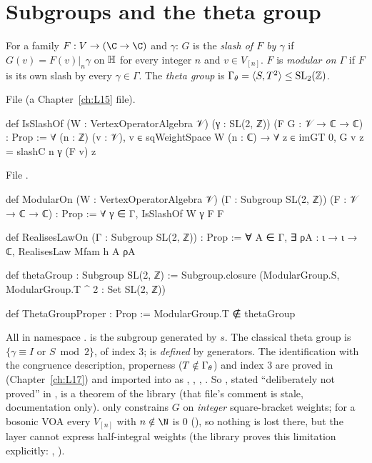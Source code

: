 \section{Subgroups and the theta group}\label{l14:sec:theta}

\begin{definition}\label{l14:def:theta}
For a family $F:V\to(\C\to\C)$ and $\gamma$: $G$ is the \emph{slash of $F$ by $\gamma$} if $G(v) = F(v)|_n\gamma$ on
$\mathbb{H}$ for every integer $n$ and $v\in V_{[n]}$. $F$ is \emph{modular on $\Gamma$} if $F$ is its own slash by every
$\gamma\in\Gamma$. The \emph{theta group} is $\Gamma_\theta = \langle S,T^2\rangle\le\mathrm{SL}_2(\mathbb{Z})$.
\end{definition}
\noindent File  (a Chapter~\ref{ch:L15} file).
\begin{leancode}
def IsSlashOf (W : VertexOperatorAlgebra 𝒱) (γ : SL(2, ℤ)) (F G : 𝒱 → ℂ → ℂ) : Prop :=
  ∀ (n : ℤ) (v : 𝒱), v ∈ sqWeightSpace W (n : ℂ) → ∀ z ∈ imGT 0, G v z = slashC n γ (F v) z
\end{leancode}
\noindent File .
\begin{leancode}
def ModularOn (W : VertexOperatorAlgebra 𝒱) (Γ : Subgroup SL(2, ℤ)) (F : 𝒱 → ℂ → ℂ) : Prop :=
  ∀ γ ∈ Γ, IsSlashOf W γ F F

def RealisesLawOn (Γ : Subgroup SL(2, ℤ)) : Prop :=
  ∀ A ∈ Γ, ∃ ρA : ι → ι → ℂ, RealisesLaw Mfam h A ρA

def thetaGroup : Subgroup SL(2, ℤ) :=
  Subgroup.closure ({ModularGroup.S, ModularGroup.T ^ 2} : Set SL(2, ℤ))

def ThetaGroupProper : Prop := ModularGroup.T ∉ thetaGroup
\end{leancode}
\begin{dictionary}
All in namespace .  is the subgroup generated by $s$. The classical theta group is
$\{\gamma\equiv I\text{ or }S\bmod 2\}$, of index $3$;  is \emph{defined} by generators. The identification
with the congruence description, properness ($T\notin\Gamma_\theta$) and index $3$ are proved in
 (Chapter~\ref{ch:L17}) and imported into  as
, , , . So
, stated ``deliberately not proved'' in , is a theorem of the library (that
file's comment is stale, documentation only).  only constrains $G$ on \emph{integer} square-bracket weights; for a bosonic VOA
every $V_{[n]}$ with $n\notin\N$ is $0$ (), so nothing is lost there, but the layer
cannot express half-integral weights (the library proves this limitation explicitly: ,
).
\end{dictionary}
